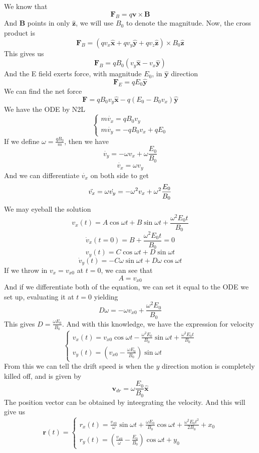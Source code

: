 \documentclass[12pt]{article}
\newcommand{\paren}[1]{\left( #1 \right)}
\newcommand{\unx}{\hat{\mathbf{x}}}
\newcommand{\uny}{\hat{\mathbf{y}}}
\newcommand{\unz}{\hat{\mathbf{z}}}
\begin{document}
\begin{enumerate}
     We know that 
    \[
    \mathbf{F}_B = q\mathbf{v}\times\mathbf{B}
    \]
    And \textbf{B} points in only $\unz$, we will use $B_0$ to denote the magnitude. Now, the cross product is
    \[
    \mathbf{F}_B = \paren{qv_x\unx + qv_y\uny + qv_z\unz} \times B_0\unz
    \]
    This gives us
    \[
    \mathbf{F}_B = qB_0\paren{v_y\unx - v_x\uny}
    \]  
    And the E field exerts force, with magnitude $E_0$, in $\uny$ direction
    \[
    \mathbf{F}_E = qE_0\uny
    \]
    We can find the net force
    \[
    \mathbf{F} = qB_0v_y\unx - q\paren{E_0 - B_0v_x}\uny
    \]
    We have the ODE by N2L
    \[
    \begin{cases}
        m\dot{v_x} = qB_0v_y\\
        m\dot{v_y} = - qB_0v_x + qE_0
    \end{cases}
    \]
    If we define $\omega  = \frac{qB_0}{m}$, then we have
    \[
    \dot{v_y} = -\omega v_x + \omega \frac{E_0}{B_0}
    \]
    \[
    \dot{v_x} = \omega v_y
    \]
    And we can differentiate $\dot{v_x}$ on both side to get
    \[
    \Ddot{v_x} = \omega\dot{v_y} = -\omega^2 v_x +\omega^2\frac{E_0}{B_0}
    \]
    We may eyeball the solution
    \[
    v_x(t) = A\cos\omega t + B\sin\omega t + \frac{\omega^2 E_0t}{B_0}
    \]
    \[
    \dot{v}_x(t=0) = B + \frac{\omega^2 E_0t}{B_0} = 0
    \]
    \[
    v_y(t) = C\cos\omega t + D\sin\omega t 
    \]
    \[
    \dot{v}_y(t) = -C\omega\sin\omega t + D\omega\cos\omega t
    \]
    If we throw in $v_x = v_{x0}$ at $t=0$, we can see that
    \[
    A = v_{x0}
    \]
    And if we differentiate both of the equation, we can set it equal to the ODE we set up, evaluating it at $t=0$ yielding
    \[
    D\omega = -\omega v_{x0} + \frac{\omega^2E_0}{B_0}
    \]
    This gives $D = \frac{\omega E_0}{B_0}$. And with this knowledge, we have the expression for velocity
    \[
    \begin{cases}
        v_x(t) = v_{x0}\cos\omega t -\frac{\omega^2 E_0 }{B_0}\sin\omega t + \frac{\omega^2 E_0t}{B_0}\\
        v_y(t) = \paren{v_{x0} - \frac{\omega E_0}{B_0}}\sin\omega t
    \end{cases}
    \]
    From this we can tell the drift speed is when the $y$ direction motion is completely killed off, and is given by 
    \[
    \mathbf{v}_{dr} = \omega\frac{E_0}{B_0}\unx
    \]
    The position vector can be obtained by inteegrating the velocity. And this will give us
    \[
    \mathbf{r}(t) = \begin{cases}
        r_x(t) = \frac{v_{x0}}{\omega}\sin\omega t +\frac{\omega E_0}{ B_0}\cos\omega t+ \frac{\omega^2E_0t^2}{2B_0} + x_0\\
        r_y(t) = \paren{\frac{v_{x0}}{\omega} - \frac{E_0}{B_0}}\cos\omega t + y_0
    \end{cases}
    \]
    
    
\end{enumerate}
\end{document}
